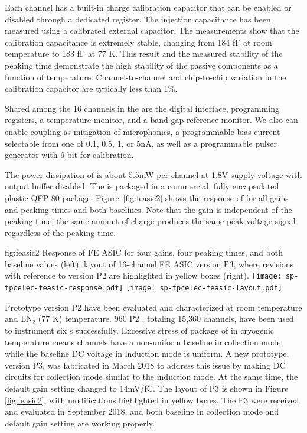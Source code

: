 Each   channel has a built-in charge calibration capacitor that can be enabled or disabled through a dedicated register. The injection capacitance has been measured using a calibrated external capacitor. The measurements show that the calibration capacitance is extremely stable, changing from 184 fF at room temperature to 183 fF at 77 K. This result and the measured stability of the peaking time demonstrate the high stability of the passive components as a function of temperature. Channel-to-channel and chip-to-chip variation in the calibration capacitor are typically less than 1\%.

Shared among the 16 channels in the   are the digital interface, programming registers, a temperature monitor, and a band-gap reference monitor. We also can enable  coupling as mitigation of microphonics, a programmable bias current selectable from one of 0.1, 0.5, 1, or 5nA, as well as a programmable pulser generator with 6-bit  for calibration. 

The power dissipation of   is about 5.5mW per channel at 1.8V supply voltage with output buffer disabled. The  is packaged in a commercial, fully encapsulated plastic QFP 80 package. Figure~\ref{fig:feasic2} shows the response of   for all gains and peaking times and both baselines. Note that the gain is independent of the peaking time; the same amount of charge produces the same peak voltage signal regardless of the peaking time.

\begin{dunefigure}
{fig:feasic2}
{Response of FE ASIC for four gains, four peaking times, and both baseline values (left); layout of 16-channel FE ASIC version P3, where revisions with reference to version P2 are highlighted in yellow boxes (right).}
\texttt{[image: sp-tpcelec-feasic-response.pdf]}
\hspace{6mm}
\texttt{[image: sp-tpcelec-feasic-layout.pdf]}
\end{dunefigure}

Prototype version P2   have been evaluated and characterized at room temperature and LN$_2$ (77 K) temperature. 960 P2  , totaling 15,360 channels, have been used to instrument six  s successfully. Excessive stress of package of   in cryogenic temperature means  channels have a non-uniform baseline in collection mode, while the baseline DC voltage in induction mode is uniform. A new prototype, version P3, was fabricated in March 2018 to address this issue by making DC circuits for collection mode similar to the induction mode. At the same time, the default gain setting changed to 14mV/fC. The layout of P3   is shown in Figure \ref{fig:feasic2}, with modifications highlighted in yellow boxes. The P3   were received and evaluated in September 2018, and both baseline in collection mode and default gain setting are working properly.

